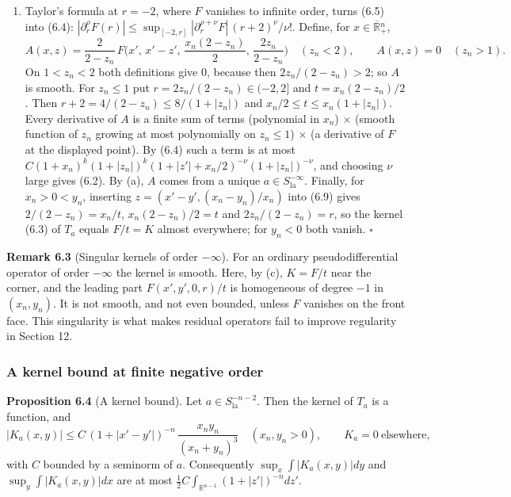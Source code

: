 \documentclass[
  11pt,
]{article}
\providecommand{\tightlist}{%
  \setlength{\itemsep}{0pt}\setlength{\parskip}{0pt}}
\begin{document}
\begin{enumerate}
\def\labelenumi{(\alph{enumi})}
\setcounter{enumi}{3}
\tightlist
\item
  Taylor's formula at \(r=-2\), where \(F\) vanishes to infinite order,
  turns (6.5) into (6.4):
  \(|\partial_r^\rho F(r)|\leq\sup_{[-2,r]}|\partial_r^{\rho+\nu}F|\,(r+2)^\nu/\nu!\).
  Define, for \(x\in\overline{\mathbb R}{}^n_+\), \[
A(x,z)=\frac2{2-z_n}\,F\Big(x',\,x'-z',\,\frac{x_n(2-z_n)}2,\,\frac{2z_n}{2-z_n}\Big)\quad(z_n<2),\qquad A(x,z)=0\quad(z_n>1).
\tag{6.9}
\] On \(1<z_n<2\) both definitions give 0, because then
  \(2z_n/(2-z_n)>2\); so \(A\) is smooth. For \(z_n\leq1\) put
  \(r=2z_n/(2-z_n)\in(-2,2]\) and \(t=x_n(2-z_n)/2\). Then
  \(r+2=4/(2-z_n)\leq8/(1+|z_n|)\) and \(x_n/2\leq t\leq x_n(1+|z_n|)\).
  Every derivative of \(A\) is a finite sum of terms (polynomial in
  \(x_n\)) \(\times\) (smooth function of \(z_n\) growing at most
  polynomially on \(z_n\leq1\)) \(\times\) (a derivative of \(F\) at the
  displayed point). By (6.4) such a term is at most
  \(C(1+x_n)^{k}(1+|z_n|)^{k}(1+|z'|+x_n/2)^{-\nu}(1+|z_n|)^{-\nu}\),
  and choosing \(\nu\) large gives (6.2). By (a), \(A\) comes from a
  unique \(a\in S^{-\infty}_{\mathrm{la}}\). Finally, for \(x_n>0<y_n\),
  inserting \(z=(x'-y',(x_n-y_n)/x_n)\) into (6.9) gives
  \(2/(2-z_n)=x_n/t\), \(x_n(2-z_n)/2=t\) and \(2z_n/(2-z_n)=r\), so the
  kernel (6.3) of \(T_a\) equals \(F/t=K\) almost everywhere; for
  \(y_n<0\) both vanish. \(\square\)
\end{enumerate}

\textbf{Remark 6.3} (Singular kernels of order \(-\infty\)). For an
ordinary pseudodifferential operator of order \(-\infty\) the kernel is
smooth. Here, by (c), \(K=F/t\) near the corner, and the leading part
\(F(x',y',0,r)/t\) is homogeneous of degree \(-1\) in \((x_n,y_n)\). It
is not smooth, and not even bounded, unless \(F\) vanishes on the front
face. This singularity is what makes residual operators fail to improve
regularity in Section 12.

\subsubsection{A kernel bound at finite negative
order}\label{a-kernel-bound-at-finite-negative-order}

\textbf{Proposition 6.4} (A kernel bound). Let
\(a\in S^{-n-2}_{\mathrm{la}}\). Then the kernel of \(T_a\) is a
function, and \[
|K_a(x,y)|\leq C\,(1+|x'-y'|)^{-n}\,\frac{x_ny_n}{(x_n+y_n)^3}\quad(x_n,y_n>0),\qquad K_a=0\ \text{elsewhere},
\tag{6.10}
\] with \(C\) bounded by a seminorm of \(a\). Consequently
\(\sup_x\int|K_a(x,y)|dy\) and \(\sup_y\int|K_a(x,y)|dx\) are at most
\(\tfrac12C\int_{\mathbb R^{n-1}}(1+|z'|)^{-n}dz'\).
\end{document}
